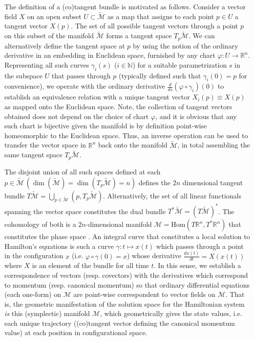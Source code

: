 \documentclass[11pt,titlepage]{report}
\begin{document}
The definition of a (co)tangent bundle is motivated as follows. Consider a vector field $X$ on an open subset $U \subset \tilde{\mathcal{M}}$ as a map that assigns to each point $p\in U$ a tangent vector $X(p)$. The set of all possible tangent vectors through a point $p$ on this subset of the manifold $\tilde{\mathcal{M}}$ forms a tangent space $T_p\tilde{\mathcal{M}}$. We can alternatively define the tangent space at $p$ by using the notion of the ordinary derivative in an embedding in Euclidean space, furnished by any chart $\varphi : U \rightarrow \mathbb{R}^n$. Representing all such curves $\gamma_i(s)$ ($i\in\mathbb{N}$) for a suitable parametrization $s$ in the subspace $U$ that passes through $p$ (typically defined such that $\gamma_i(0) = p$ for convenience), we operate with the ordinary derivative $\frac{d}{ds}(\varphi \circ \gamma_i)(0)$ to establish an equivalence relation with a unique tangent vector $X_i(p)\equiv X(p)$ as mapped onto the Euclidean space. Note, the collection of tangent vectors obtained does not depend on the choice of chart $\varphi$, and it is obvious that any such chart is bijective given the manifold is by definition point-wise homeomorphic to the Euclidean space. Thus, an inverse operation can be used to transfer the vector space in $\mathbb{R}^n$ back onto the manifold $\tilde{\mathcal{M}}$, in total assembling the same tangent space $T_p\tilde{\mathcal{M}}$.

The disjoint union of all such spaces defined at each $p\in\tilde{\mathcal{M}}\, (\dim (\tilde{\mathcal{M}}) = \dim (T_p\tilde{\mathcal{M}}) = n)$ defines the $2n$ dimensional tangent bundle $T\tilde{\mathcal{M}} = \bigcup_{p\in\tilde{\mathcal{M}}} (p,T_p\tilde{\mathcal{M}})$. Alternatively, the set of all linear functionals spanning the vector space constitutes the dual bundle $T^*\tilde{\mathcal{M}} = (T\tilde{\mathcal{M}})^*$. The cohomology of both is a $2n$-dimensional manifold $\mathcal{M} = \mathrm{Hom}(T\mathbb{R}^n,T^*\mathbb{R}^n)$ that constitutes the phase space .  An integral curve that constitutes a local solution to Hamilton's equations is such a curve $\gamma\colon t\mapsto x(t)$ which passes through a point in the configuration $x$ (i.e. $\varphi\circ\gamma (0) = x$) whose derivative $\frac{dx(t)}{dt} = X(x(t))$ where $X$ is an element of the bundle for all time $t$. In this sense, we establish a correspondence of vectors (resp. covectors) with the derivatives which correspond to momentum (resp. canonical momentum) so that ordinary differential equations (each one-form) on $\mathcal{M}$ are point-wise correspondent to vector fields on $\mathcal{M}$. That is, the geometric manifestation of the solution space for the Hamiltonian system \emph{is} this (symplectic) manifold $\mathcal{M}$, which geometrically gives the state values, i.e. each unique trajectory ((co)tangent vector defining the canonical momentum value) at each position in configurational space.
\end{document}
